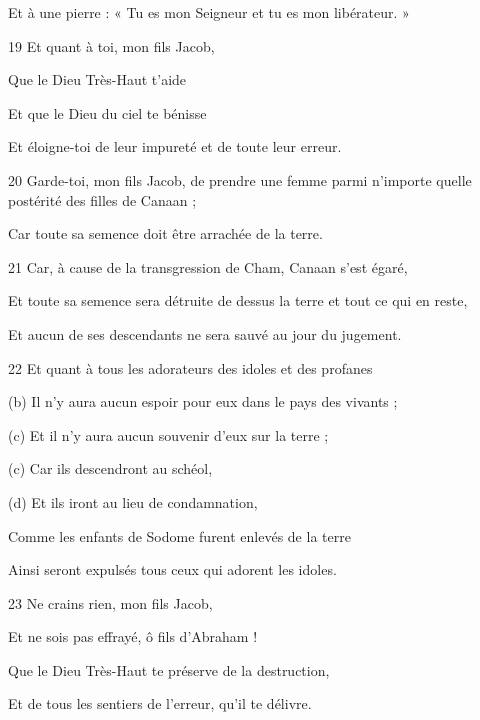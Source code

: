 \par     Et à une pierre : « Tu es mon Seigneur et tu es mon libérateur. »  
\par     [Et ils n'ont pas de cœur.]
\par    
\par 19 Et quant à toi, mon fils Jacob,  
\par     Que le Dieu Très-Haut t'aide  
\par     Et que le Dieu du ciel te bénisse  
\par     Et éloigne-toi de leur impureté et de toute leur erreur.
\par    
\par 20 Garde-toi, mon fils Jacob, de prendre une femme parmi n'importe quelle postérité des filles de Canaan ;
\par    
\par     Car toute sa semence doit être arrachée de la terre.
\par    
\par 21 Car, à cause de la transgression de Cham, Canaan s'est égaré,  
\par     Et toute sa semence sera détruite de dessus la terre et tout ce qui en reste,  
\par     Et aucun de ses descendants ne sera sauvé au jour du jugement.
\par    
\par 22 Et quant à tous les adorateurs des idoles et des profanes  
\par     (b) Il n'y aura aucun espoir pour eux dans le pays des vivants ;  
\par     (c) Et il n'y aura aucun souvenir d'eux sur la terre ;  
\par     (c) Car ils descendront au schéol,  
\par     (d) Et ils iront au lieu de condamnation,
\par    
\par     Comme les enfants de Sodome furent enlevés de la terre  
\par     Ainsi seront expulsés tous ceux qui adorent les idoles.
\par    
\par 23 Ne crains rien, mon fils Jacob,  
\par     Et ne sois pas effrayé, ô fils d'Abraham !
\par    
\par     Que le Dieu Très-Haut te préserve de la destruction,  
\par     Et de tous les sentiers de l'erreur, qu'il te délivre.
